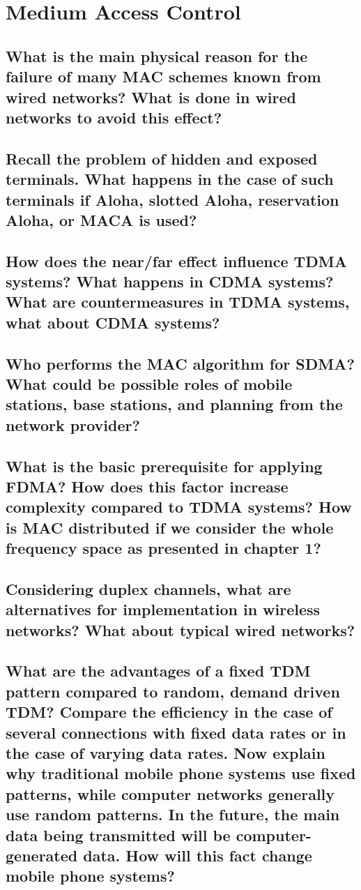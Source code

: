 \section{Medium Access Control}

\subsection{What is the main physical reason for the failure of many MAC schemes known from
wired networks? What is done in wired networks to avoid this effect?}

\subsection{Recall the problem of hidden and exposed terminals. What happens in the case of
such terminals if Aloha, slotted Aloha, reservation Aloha, or MACA is used?}

\subsection{How does the near/far effect influence TDMA systems? What happens in CDMA
systems? What are countermeasures in TDMA systems, what about CDMA systems?}

\subsection{Who performs the MAC algorithm for SDMA? What could be possible roles of mobile
stations, base stations, and planning from the network provider?}

\subsection{What is the basic prerequisite for applying FDMA? How does this factor increase
complexity compared to TDMA systems? How is MAC distributed if we consider the
whole frequency space as presented in chapter 1?}

\subsection{Considering duplex channels, what are alternatives for implementation in wireless
networks? What about typical wired networks?}

\subsection{What are the advantages of a fixed TDM pattern compared to random, demand
driven TDM? Compare the efficiency in the case of several connections with fixed
data rates or in the case of varying data rates. Now explain why traditional mobile
phone systems use fixed patterns, while computer networks generally use random
patterns. In the future, the main data being transmitted will be computer-generated
data. How will this fact change mobile phone systems?}

